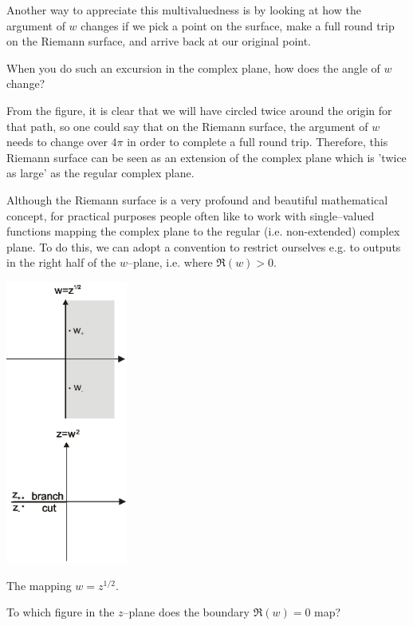 Another way to appreciate this multivaluedness is by looking at how the argument of $w$ changes if we pick a point on the surface, make a full round trip on the Riemann surface, and arrive back at our original point.

\begin{cue}
When you do such an excursion in the complex plane, how does the angle of $w$ change? 
\end{cue}

From the figure, it is clear that we will have circled twice around the origin for that path, so one could say that on the Riemann surface, the argument of $w$ needs to change over $4 \pi$ in order to complete a full round trip. Therefore, this Riemann surface can be seen as an extension of the complex plane which is 'twice as large' as the regular complex plane.


Although the Riemann surface is a very profound and beautiful mathematical concept, for practical purposes people often like to work with single--valued functions mapping the complex plane to the regular (i.e. non-extended) complex plane. To do this, we can adopt a convention to restrict ourselves e.g. to outputs in the right half of the $w$--plane, i.e. where $\Re(w)>0$.


\begin{marginfigure}[-1cm]
\centering
\includegraphics[width=4cm]{complex/figures/branchcut_portrait}
\caption{The mapping $w=z^{1/2}$.}
\label{fig-branchcut}
\end{marginfigure}


\begin{cue}
To which figure in the $z$--plane does the boundary $\Re(w)=0$ map?
\end{cue}

